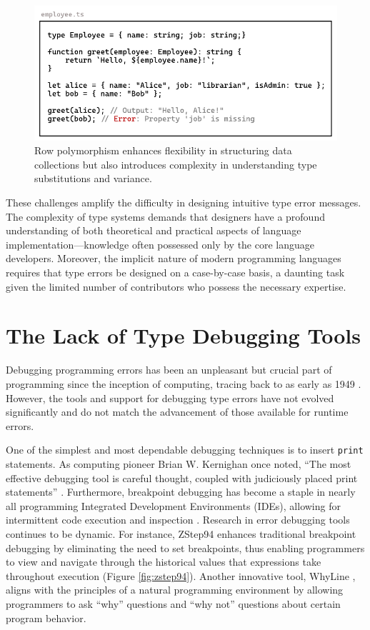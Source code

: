 \begin{figure}[hbt]
  \includegraphics[width=\linewidth]{RowPolymorphism.pdf}
  \caption{
    \label{fig:row-polymophism}
Row polymorphism enhances flexibility in structuring data collections but also introduces complexity in understanding type substitutions and variance.
    }
\end{figure}

These challenges amplify the difficulty in designing intuitive type error messages. The complexity of type systems demands that designers have a profound understanding of both theoretical and practical aspects of language implementation—knowledge often possessed only by the core language developers. Moreover, the implicit nature of modern programming languages requires that type errors be designed on a case-by-case basis, a daunting task given the limited number of contributors who possess the necessary expertise.

\section{The Lack of Type Debugging Tools}

Debugging programming errors has been an unpleasant but crucial part of programming since the inception of computing, tracing back to as early as 1949 \cite{Campbell-Kelly1992-rn}. However, the tools and support for debugging type errors have not evolved significantly and do not match the advancement of those available for runtime errors.

One of the simplest and most dependable debugging techniques is to insert \texttt{print} statements. As computing pioneer Brian W. Kernighan once noted, ``The most effective debugging tool is careful thought, coupled with judiciously placed print statements'' \cite{Kernighan1978-xs}. Furthermore, breakpoint debugging has become a staple in nearly all programming Integrated Development Environments (IDEs), allowing for intermittent code execution and inspection \cite{fig:breakpoint}. Research in error debugging tools continues to be dynamic. For instance, ZStep94 \cite{Lieberman1995-lg} enhances traditional breakpoint debugging by eliminating the need to set breakpoints, thus enabling programmers to view and navigate through the historical values that expressions take throughout execution (Figure \ref{fig:zstep94}). Another innovative tool, WhyLine \cite{Ko2009-uf}, aligns with the principles of a natural programming environment \cite{Myers2004-fy} by allowing programmers to ask ``why'' questions and ``why not'' questions about certain program behavior.

